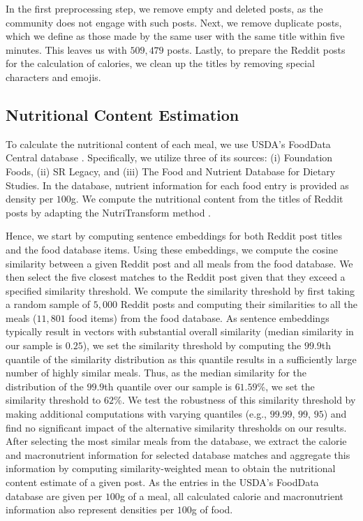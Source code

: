 In the first preprocessing step, we remove empty and deleted posts, as the community does not engage with such posts. Next, we remove duplicate posts, which we define as those made by the same user with the same title within five minutes. 
This leaves us with $509,479$ posts.
Lastly, to prepare the Reddit posts for the calculation of calories, we clean up the titles by removing special characters and emojis. 

\subsection{Nutritional Content Estimation}
To calculate the nutritional content of each meal, we use USDA’s FoodData Central database \cite{mckillop_fooddata_2021}. Specifically, we utilize three of its sources: (i) Foundation Foods, (ii) SR Legacy, and (iii) The Food and Nutrient Database for Dietary Studies.
In the database, nutrient information for each food entry is provided as density per $100$g.
We compute the nutritional content from the titles of Reddit posts by adapting the NutriTransform method \cite{ruprechter_2025}. 

Hence, we start by computing sentence embeddings \cite{reimers_sentence-bert_2019} for both Reddit post titles and the food database items. 
Using these embeddings, we compute the cosine similarity between a given Reddit post and all meals from the food database. We then select the five closest matches to the Reddit post given that they exceed a specified similarity threshold. We compute the similarity threshold by first taking a random sample of $5,000$ Reddit posts and computing their similarities to all the meals ($11,801$ food items) from the food database. As sentence embeddings typically result in vectors with substantial overall similarity (median similarity in our sample is $0.25$), we set the similarity threshold by computing the $99.9$th quantile of the similarity distribution as this quantile results in a sufficiently large number of highly similar meals. Thus, as the median similarity for the distribution of the $99.9$th quantile over our sample is $61.59$\%, we set the similarity threshold to $62$\%. 
We test the robustness of this similarity threshold by making additional computations with varying quantiles (e.g., $99.99$, $99$, $95$) and find no significant impact of the alternative similarity thresholds on our results.
After selecting the most similar meals from the database, we extract the calorie and macronutrient information for selected database matches and aggregate this information by computing similarity-weighted mean to obtain the nutritional content estimate of a given post. 
As the entries in the USDA's FoodData database are given per $100$g of a meal, all calculated calorie and macronutrient information also represent densities per $100$g of food.

